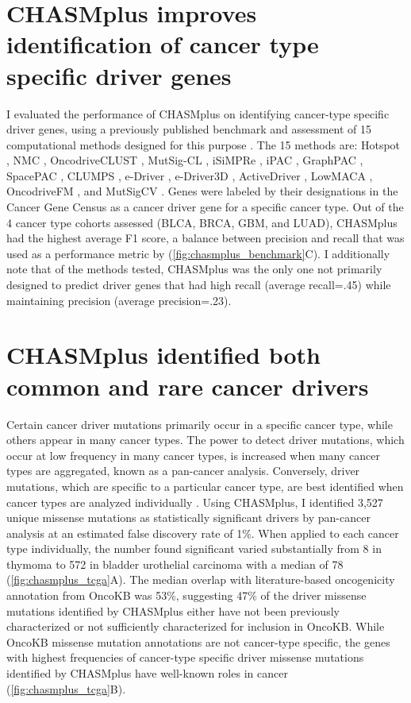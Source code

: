 \section{CHASMplus improves identification of cancer type specific driver genes}
I evaluated the performance of CHASMplus on identifying cancer-type specific driver genes, using a previously published benchmark and assessment of 15 computational methods designed for this purpose \cite{RN52}. The 15 methods are: Hotspot \cite{RN16}, NMC \cite{RN106}, OncodriveCLUST \cite{RN54}, MutSig-CL \cite{RN14}, iSiMPRe \cite{RN150}, iPAC \cite{RN15}, GraphPAC \cite{RN151}, SpacePAC \cite{RN152}, CLUMPS \cite{RN105}, e-Driver \cite{RN153}, e-Driver3D \cite{RN45}, ActiveDriver \cite{RN154}, LowMACA \cite{RN155}, OncodriveFM \cite{RN53}, and MutSigCV \cite{RN13}. Genes were labeled by their designations in the Cancer Gene Census as a cancer driver gene for a specific cancer type. Out of the 4 cancer type cohorts assessed (BLCA, BRCA, GBM, and LUAD), CHASMplus had the highest average F1 score, a balance between precision and recall that was used as a performance metric by \cite{RN52} (\autoref{fig:chasmplus_benchmark}C). I additionally note that of the methods tested, CHASMplus was the only one not primarily designed to predict driver genes that had high recall (average recall=.45) while maintaining precision (average precision=.23). 

\section{CHASMplus identified both common and rare cancer drivers}
Certain cancer driver mutations primarily occur in a specific cancer type, while others appear in many cancer types.  The power to detect driver mutations, which occur at low frequency in many cancer types, is increased when many cancer types are aggregated, known as a pan-cancer analysis. Conversely, driver mutations, which are specific to a particular cancer type, are best identified when cancer types are analyzed individually \cite{RN59}. Using CHASMplus, I identified 3,527 unique missense mutations as statistically significant drivers by pan-cancer analysis at an estimated false discovery rate of 1\%. When applied to each cancer type individually, the number found significant varied substantially from 8 in thymoma to 572 in bladder urothelial carcinoma with a median of 78 (\autoref{fig:chasmplus_tcga}A). The median overlap with literature-based oncogenicity annotation from OncoKB was 53\%, suggesting 47\% of the driver missense mutations identified by CHASMplus either have not been previously characterized or not sufficiently characterized for inclusion in OncoKB.  While OncoKB missense mutation annotations are not cancer-type specific, the genes with highest frequencies of cancer-type specific driver missense mutations identified by CHASMplus have well-known roles in cancer \cite{RN5} (\autoref{fig:chasmplus_tcga}B). 

